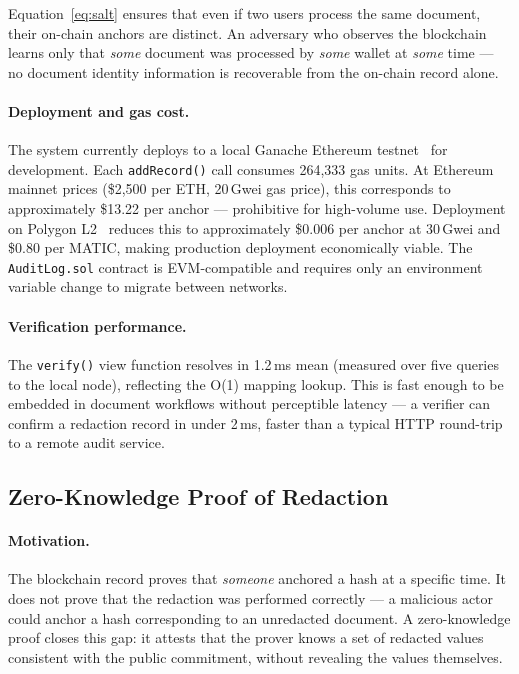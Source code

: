 \documentclass[conference]{IEEEtran}
\begin{document}
Equation~\ref{eq:salt} ensures that even if two users
process the same document, their on-chain anchors are
distinct.
An adversary who observes the blockchain learns only
that \emph{some} document was processed by
\emph{some} wallet at \emph{some} time --- no
document identity information is recoverable from
the on-chain record alone.

\paragraph{Deployment and gas cost.}
The system currently deploys to a local Ganache
Ethereum testnet~\cite{ganache} for development.
Each \texttt{addRecord()} call consumes 264,333 gas
units.
At Ethereum mainnet prices (\$2,500 per ETH, 20\,Gwei
gas price), this corresponds to approximately
\$13.22 per anchor --- prohibitive for high-volume
use.
Deployment on Polygon L2~\cite{polygon2021} reduces
this to approximately \$0.006 per anchor at 30\,Gwei
and \$0.80 per MATIC, making production deployment
economically viable.
The \texttt{AuditLog.sol} contract is EVM-compatible
and requires only an environment variable change to
migrate between networks.

\paragraph{Verification performance.}
The \texttt{verify()} view function resolves in
1.2\,ms mean (measured over five queries to the local
node), reflecting the O(1) mapping lookup.
This is fast enough to be embedded in document
workflows without perceptible latency --- a verifier
can confirm a redaction record in under 2\,ms,
faster than a typical HTTP round-trip to a remote
audit service.

\subsection{Zero-Knowledge Proof of Redaction}

\paragraph{Motivation.}
The blockchain record proves that \emph{someone}
anchored a hash at a specific time.
It does not prove that the redaction was performed
correctly --- a malicious actor could anchor a hash
corresponding to an unredacted document.
A zero-knowledge proof closes this gap: it attests
that the prover knows a set of redacted values
consistent with the public commitment, without
revealing the values themselves.
\end{document}
